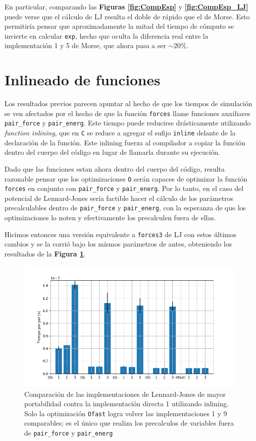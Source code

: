 \documentclass[twoside, 12pt]{article}
\begin{document}
En particular, comparando las \textbf{Figuras \ref{fig:CompEsp}} y \textbf{\ref{fig:CompEsp_LJ}} puede verse que el c\'alculo de LJ resulta el doble de r\'apido que el de Morse. Esto permitir\'ia pensar que aproximadamente la mitad del tiempo de c\'omputo se invierte en calcular \texttt{exp}, hecho que oculta la diferencia real entre la implementaci\'on 1 y 5 de Morse, que ahora pasa a ser $\sim 20\%$. 

\section{Inlineado de funciones}

Los resultados previos parecen apuntar al hecho de que los tiempos de simulaci\'on se ven afectados por el hecho de que la funci\'on \texttt{forces} llame funciones auxiliares \texttt{pair\_force} y \texttt{pair\_energ}. Este tiempo puede reducirse dr\'asticamente utilizando \textit{function inlining}, que en \texttt{C} se reduce a agregar el sufijo \texttt{inline} delante de la declaraci\'on de la funci\'on. Este inlining fuerza al compilador a copiar la funci\'on dentro del cuerpo del c\'odigo en lugar de llamarla durante su ejecución. 

Dado que las funciones estan ahora dentro del cuerpo del c\'odigo, resulta razonable pensar que los optimizaciones \texttt{O} ser\'an capaces de optimizar la funci\'on \texttt{forces} en conjunto con \texttt{pair\_force} y \texttt{pair\_energ}. Por lo tanto, en el caso del potencial de Lennard-Jones ser\'ia factible hacer el c\'alculo de los par\'ametros precalculables dentro de \texttt{pair\_force} y \texttt{pair\_energ}, con la esperanza de que los optimizaciones lo noten y efectivamente los precalculen fuera de ellas.

Hicimos entonces una versi\'on equivalente a \texttt{forces3} de LJ con estos últimos cambios y se la corri\'o bajo los mismos par\'ametros de antes, obteniendo los resultados de la \textbf{Figura \ref{fig:CompEsp_LJ_inline}}.

\begin{figure}[h]
	\centering
	\includegraphics[trim = 10mm 5mm 10mm 5mm, clip, width=0.6\columnwidth]{Comp_tiempos_LJ_inline.png}
	\caption{Comparaci\'on de las implementaciones de Lennard-Jones de mayor portabilidad contra la implementaci\'on directa 1 utilizando inlining. Solo la optimización \texttt{Ofast} logra volver las implementaciones 1 y 9 comparables; es el \'unico que realiza los precalculos de variables fuera de \texttt{pair\_force} y \texttt{pair\_energ}}
	\label{fig:CompEsp_LJ_inline}
\end{figure}
\end{document}
